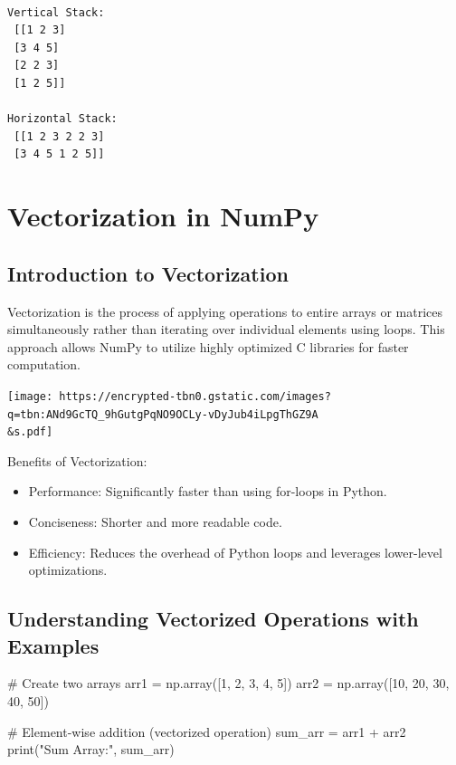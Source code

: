 \documentclass[
  letterpaper,
  DIV=11,
  numbers=noendperiod]{scrreprt}
\newenvironment{Shaded}{\begin{snugshade}}{\end{snugshade}}
\newcommand{\BuiltInTok}[1]{\textcolor[rgb]{0.00,0.23,0.31}{#1}}
\newcommand{\CommentTok}[1]{\textcolor[rgb]{0.37,0.37,0.37}{#1}}
\newcommand{\DecValTok}[1]{\textcolor[rgb]{0.68,0.00,0.00}{#1}}
\newcommand{\NormalTok}[1]{\textcolor[rgb]{0.00,0.23,0.31}{#1}}
\newcommand{\OperatorTok}[1]{\textcolor[rgb]{0.37,0.37,0.37}{#1}}
\newcommand{\StringTok}[1]{\textcolor[rgb]{0.13,0.47,0.30}{#1}}
\providecommand{\tightlist}{%
  \setlength{\itemsep}{0pt}\setlength{\parskip}{0pt}}\usepackage{longtable,booktabs,array}
\begin{document}
\begin{verbatim}

Vertical Stack:
 [[1 2 3]
 [3 4 5]
 [2 2 3]
 [1 2 5]]

Horizontal Stack:
 [[1 2 3 2 2 3]
 [3 4 5 1 2 5]]
\end{verbatim}

\hypertarget{vectorization-in-numpy}{%
\section{Vectorization in NumPy}\label{vectorization-in-numpy}}

\hypertarget{introduction-to-vectorization}{%
\subsection{Introduction to
Vectorization}\label{introduction-to-vectorization}}

Vectorization is the process of applying operations to entire arrays or
matrices simultaneously rather than iterating over individual elements
using loops. This approach allows NumPy to utilize highly optimized C
libraries for faster computation.

\texttt{[image: https://encrypted-tbn0.gstatic.com/images?q=tbn:ANd9GcTQ\_9hGutgPqNO9OCLy-vDyJub4iLpgThGZ9A\\\&s.pdf]}

Benefits of Vectorization:

\begin{itemize}
\tightlist
\item
  Performance: Significantly faster than using for-loops in Python.
\item
  Conciseness: Shorter and more readable code.
\item
  Efficiency: Reduces the overhead of Python loops and leverages
  lower-level optimizations.
\end{itemize}

\hypertarget{understanding-vectorized-operations-with-examples}{%
\subsection{Understanding Vectorized Operations with
Examples}\label{understanding-vectorized-operations-with-examples}}

\begin{Shaded}
\begin{Highlighting}[]
\CommentTok{\# Create two arrays}
\NormalTok{arr1 }\OperatorTok{=}\NormalTok{ np.array([}\DecValTok{1}\NormalTok{, }\DecValTok{2}\NormalTok{, }\DecValTok{3}\NormalTok{, }\DecValTok{4}\NormalTok{, }\DecValTok{5}\NormalTok{])}
\NormalTok{arr2 }\OperatorTok{=}\NormalTok{ np.array([}\DecValTok{10}\NormalTok{, }\DecValTok{20}\NormalTok{, }\DecValTok{30}\NormalTok{, }\DecValTok{40}\NormalTok{, }\DecValTok{50}\NormalTok{])}

\CommentTok{\# Element{-}wise addition (vectorized operation)}
\NormalTok{sum\_arr }\OperatorTok{=}\NormalTok{ arr1 }\OperatorTok{+}\NormalTok{ arr2}
\BuiltInTok{print}\NormalTok{(}\StringTok{"Sum Array:"}\NormalTok{, sum\_arr)}
\end{Highlighting}
\end{Shaded}
\end{document}
